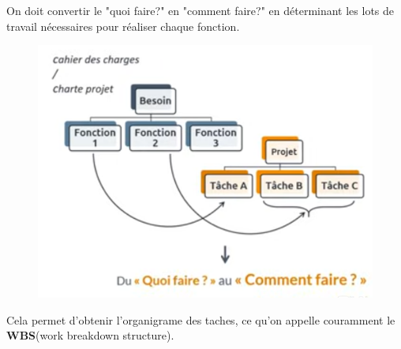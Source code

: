 On doit convertir le "quoi faire?" en "comment faire?" en déterminant les lots de travail nécessaires pour réaliser chaque fonction.
\begin{figure}[!h]
	\begin{center}
		\includegraphics[scale=0.2]{images/lots.png}
	\end{center}
\end{figure}
Cela permet d'obtenir l'organigrame des taches, ce qu'on appelle couramment le \textbf{WBS}(work breakdown structure).\\

